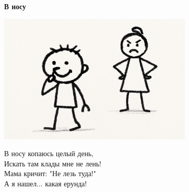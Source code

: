 \vspace*{\fill}
\begin{center}
  {\huge\textbf{В носу}}

  \vspace{1.5em}
  \includegraphics[width=0.7\textwidth]{pictures/nose.png}
  \vspace{4em}
  \parbox{0.6\textwidth}{
    \LARGE
    \begin{spacing}{1.2}
      В носу копаюсь целый день,\\
      Искать там клады мне не лень!\\
      Мама кричит: "Не лезь туда!"\\
      А я нашел... какая ерунда! %
    \end{spacing}
      
  }
\end{center}
\vspace*{\fill}